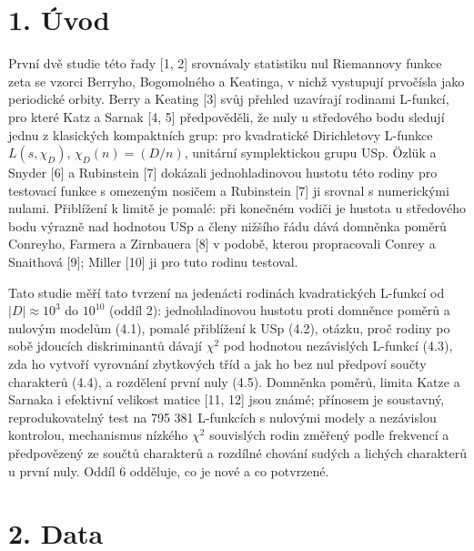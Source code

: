 \documentclass[
  10pt,
]{article}
\begin{document}
\hypertarget{uxfavod}{%
\section{1. Úvod}\label{uxfavod}}

První dvě studie této řady {[}1, 2{]} srovnávaly statistiku nul
Riemannovy funkce zeta se vzorci Berryho, Bogomolného a Keatinga, v
nichž vystupují prvočísla jako periodické orbity. Berry a Keating
{[}3{]} svůj přehled uzavírají rodinami L-funkcí, pro které Katz a
Sarnak {[}4, 5{]} předpověděli, že nuly u středového bodu sledují jednu
z klasických kompaktních grup: pro kvadratické Dirichletovy L-funkce
\(L(s, \chi_D)\), \(\chi_D(n) = (D/n)\), unitární symplektickou grupu
USp. Özlük a Snyder {[}6{]} a Rubinstein {[}7{]} dokázali
jednohladinovou hustotu této rodiny pro testovací funkce s omezeným
nosičem a Rubinstein {[}7{]} ji srovnal s numerickými nulami. Přiblížení
k limitě je pomalé: při konečném vodiči je hustota u středového bodu
výrazně nad hodnotou USp a členy nižšího řádu dává domněnka poměrů
Conreyho, Farmera a Zirnbauera {[}8{]} v podobě, kterou propracovali
Conrey a Snaithová {[}9{]}; Miller {[}10{]} ji pro tuto rodinu testoval.

Tato studie měří tato tvrzení na jedenácti rodinách kvadratických
L-funkcí od \(|D| \approx 10^3\) do \(10^{10}\) (oddíl 2):
jednohladinovou hustotu proti domněnce poměrů a nulovým modelům (4.1),
pomalé přiblížení k USp (4.2), otázku, proč rodiny po sobě jdoucích
diskriminantů dávají \(\chi^2\) pod hodnotou nezávislých L-funkcí (4.3),
zda ho vytvoří vyrovnání zbytkových tříd a jak ho bez nul předpoví
součty charakterů (4.4), a rozdělení první nuly (4.5). Domněnka poměrů,
limita Katze a Sarnaka i efektivní velikost matice {[}11, 12{]} jsou
známé; přínosem je soustavný, reprodukovatelný test na 795 381
L-funkcích s nulovými modely a nezávislou kontrolou, mechanismus nízkého
\(\chi^2\) souvislých rodin změřený podle frekvencí a předpovězený ze
součtů charakterů a rozdílné chování sudých a lichých charakterů u první
nuly. Oddíl 6 odděluje, co je nové a co potvrzené.

\hypertarget{data}{%
\section{2. Data}\label{data}}
\end{document}
